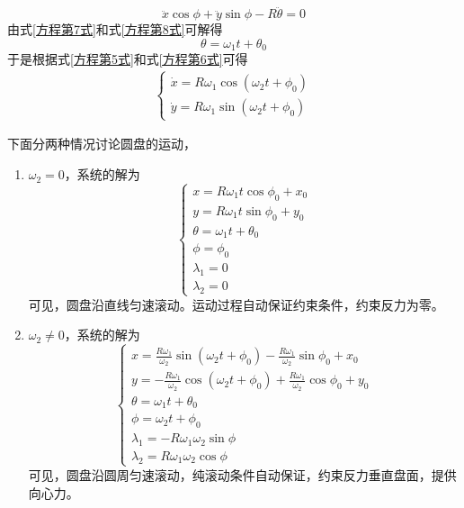 \begin{solution}
\begin{equation}
	\ddot{x} \cos \phi+\ddot{y}\sin \phi - R\ddot{\theta} = 0
	\label{方程第8式}
\end{equation}
由式\eqref{方程第7式}和式\eqref{方程第8式}可解得
\begin{equation*}
	\theta = \omega_1 t + \theta_0
\end{equation*}
于是根据式\eqref{方程第5式}和式\eqref{方程第6式}可得
\begin{align*}
	\begin{cases}
		\dot{x} = R\omega_1 \cos(\omega_2 t + \phi_0) \\
		\dot{y} = R\omega_1 \sin(\omega_2 t + \phi_0)
	\end{cases}
\end{align*}

下面分两种情况讨论圆盘的运动，
\begin{enumerate}
\item $\omega_2 = 0$，系统的解为
\begin{equation}
\begin{cases}
	x = R\omega_1 t \cos \phi_0 + x_0 \\
	y = R\omega_1 t \sin \phi_0 + y_0 \\
	\theta = \omega_1 t + \theta_0 \\
	\phi = \phi_0 \\
	\lambda_1 = 0 \\
	\lambda_2 = 0
\end{cases}
\end{equation}
可见，圆盘沿直线匀速滚动。运动过程自动保证约束条件，约束反力为零。
\item $\omega_2 \neq 0$，系统的解为
\begin{equation}
\begin{cases}
	\displaystyle x = \frac{R\omega_1}{\omega_2} \sin(\omega_2 t + \phi_0) - \frac{R\omega_1}{\omega_2} \sin \phi_0 + x_0 \\[1,5ex]
	\displaystyle y = -\frac{R\omega_1}{\omega_2} \cos(\omega_2 t + \phi_0) + \frac{R\omega_1}{\omega_2} \cos \phi_0 + y_0 \\
	\theta = \omega_1 t + \theta_0 \\
	\phi = \omega_2 t + \phi_0 \\
	\lambda_1 = -R\omega_1 \omega_2 \sin \phi \\
	\lambda_2 = R\omega_1 \omega_2 \cos \phi
\end{cases}
\end{equation}	
可见，圆盘沿圆周匀速滚动，纯滚动条件自动保证，约束反力垂直盘面，提供向心力。
\end{enumerate}
\end{solution}

